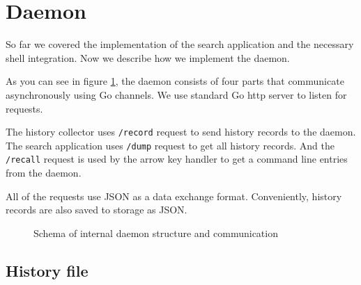 \section{Daemon}

So far we covered the implementation of the search application and the necessary shell integration. Now we describe how we implement the daemon.


As you can see in figure \ref{impl-daemon-channels}, the daemon consists of four parts that communicate asynchronously using Go channels\cite{lib-go-channels}. We use standard Go http server\cite{lib-go-http} to listen for requests. 

The history collector uses \verb|/record| request to send history records to the daemon. The search application uses \verb|/dump| request to get all history records. And the \verb|/recall| request is used by the arrow key handler to get a command line entries from the daemon. 

All of the requests use JSON as a data exchange format. Conveniently, history records are also saved to storage as JSON.

\begin{figure}
\centering
  \caption{Schema of internal daemon structure and communication}
  \label{impl-daemon-channels}
\end{figure}

\subsection{History file}

